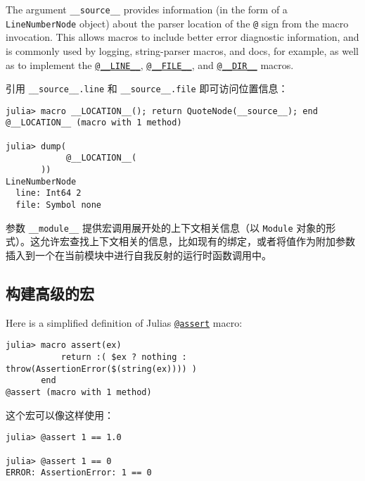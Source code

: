 The argument \texttt{\_\_source\_\_} provides information (in the form of a \texttt{LineNumberNode} object) about the parser location of the \texttt{@} sign from the macro invocation. This allows macros to include better error diagnostic information, and is commonly used by logging, string-parser macros, and docs, for example, as well as to implement the \hyperlink{277452200962288519}{\texttt{@\_\_LINE\_\_}}, \hyperlink{1518763743618824993}{\texttt{@\_\_FILE\_\_}}, and \hyperlink{12719499456415901450}{\texttt{@\_\_DIR\_\_}} macros.



引用 \texttt{\_\_source\_\_.line} 和 \texttt{\_\_source\_\_.file} 即可访问位置信息：




\begin{verbatim}
julia> macro __LOCATION__(); return QuoteNode(__source__); end
@__LOCATION__ (macro with 1 method)

julia> dump(
            @__LOCATION__(
       ))
LineNumberNode
  line: Int64 2
  file: Symbol none
\end{verbatim}



参数 \texttt{\_\_module\_\_} 提供宏调用展开处的上下文相关信息（以 \texttt{Module} 对象的形式）。这允许宏查找上下文相关的信息，比如现有的绑定，或者将值作为附加参数插入到一个在当前模块中进行自我反射的运行时函数调用中。



\hypertarget{12271969370439662350}{}


\subsection{构建高级的宏}



Here is a simplified definition of Julia{\textquotesingle}s \hyperlink{4796942656392369899}{\texttt{@assert}} macro:




\begin{verbatim}
julia> macro assert(ex)
           return :( $ex ? nothing : throw(AssertionError($(string(ex)))) )
       end
@assert (macro with 1 method)
\end{verbatim}



这个宏可以像这样使用：




\begin{verbatim}
julia> @assert 1 == 1.0

julia> @assert 1 == 0
ERROR: AssertionError: 1 == 0
\end{verbatim}



